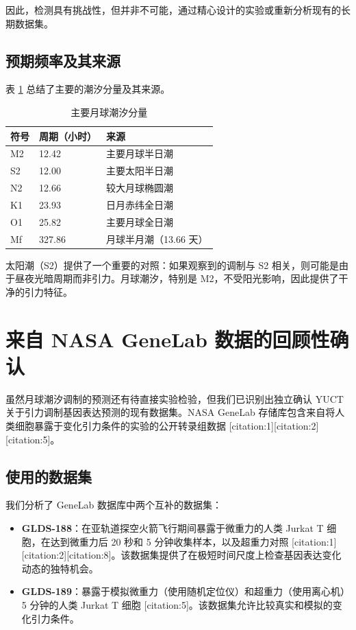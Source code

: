 \documentclass[12pt,a4paper]{article}
\theoremstyle{remark}
\begin{document}
	因此，检测具有挑战性，但并非不可能，通过精心设计的实验或重新分析现有的长期数据集。
	
	\subsection{预期频率及其来源}
	
	表 \ref{tab:tides} 总结了主要的潮汐分量及其来源。
	
	\begin{table}[htbp]
		\centering
		\caption{主要月球潮汐分量}
		\label{tab:tides}
		\small
		\begin{tabular}{lll}
			\toprule
			符号 & 周期（小时） & 来源 \\
			\midrule
			M2 & 12.42 & 主要月球半日潮 \\
			S2 & 12.00 & 主要太阳半日潮 \\
			N2 & 12.66 & 较大月球椭圆潮 \\
			K1 & 23.93 & 日月赤纬全日潮 \\
			O1 & 25.82 & 主要月球全日潮 \\
			Mf & 327.86 & 月球半月潮（13.66 天） \\
			\bottomrule
		\end{tabular}
	\end{table}
	
	太阳潮（S2）提供了一个重要的对照：如果观察到的调制与 S2 相关，则可能是由于昼夜光暗周期而非引力。月球潮汐，特别是 M2，不受阳光影响，因此提供了干净的引力特征。
	
	\section{来自 NASA GeneLab 数据的回顾性确认}
	\label{sec:genelab}
	
	虽然月球潮汐调制的预测还有待直接实验检验，但我们已识别出独立确认 YUCT 关于引力调制基因表达预测的现有数据集。NASA GeneLab 存储库包含来自将人类细胞暴露于变化引力条件的实验的公开转录组数据 [citation:1][citation:2][citation:5]。
	
	\subsection{使用的数据集}
	
	我们分析了 GeneLab 数据库中两个互补的数据集：
	
	\begin{itemize}
		\item \textbf{GLDS-188}：在亚轨道探空火箭飞行期间暴露于微重力的人类 Jurkat T 细胞，在达到微重力后 20 秒和 5 分钟收集样本，以及超重力对照 [citation:1][citation:2][citation:8]。该数据集提供了在极短时间尺度上检查基因表达变化动态的独特机会。
		
		\item \textbf{GLDS-189}：暴露于模拟微重力（使用随机定位仪）和超重力（使用离心机）5 分钟的人类 Jurkat T 细胞 [citation:5]。该数据集允许比较真实和模拟的变化引力条件。
	\end{itemize}
	
\end{document}
